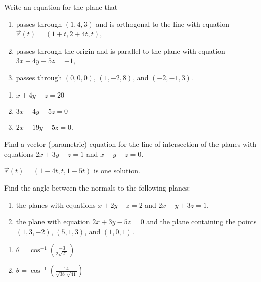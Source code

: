 \begin{exercises}
\begin{problist}
        \prob   Write an equation for the plane that
        \begin{enumerate}
            \item   passes through $(1, 4, 3)$ and is orthogonal to the line with equation $\vec{r}(t) =
                (1 + t, 2 + 4t, t)$,
            \item   passes through the origin and is parallel to the plane with equation $3x + 4y - 5z =
                -1$,
            \item   passes through $(0, 0, 0)$, $(1, -2, 8)$, and $(-2, -1, 3)$.
        \end{enumerate}
        \begin{solution}
            \begin{enumerate}
                \item   $x + 4y + z = 20$
                \item   $3x + 4y -5z = 0$
                \item   $2x - 19y -5z = 0$.           
            \end{enumerate}
        \end{solution}

        \prob   Find a vector (parametric) equation for the line of intersection of the planes with
        equations $2x + 3y - z = 1$ and $x - y - z = 0$.
        \begin{solution}
            $\vec{r}(t) = (1-4t, t, 1-5t)$ is one solution.
        \end{solution}

        \prob   Find the angle between the normals to the following planes:
        \begin{enumerate}
            \item   the planes with equations $x + 2y -z = 2$ and $2x - y + 3z = 1$,
            \item   the plane with equation $2x+3y-5z=0$ and the plane containing the points $(1,3,-2)$,
                $(5,1,3)$, and $(1,0,1)$.
        \end{enumerate}
        \begin{solution}
            \begin{enumerate}
                \item   $\theta = \cos^{-1}\left(\frac{-3}{2\sqrt{21}}\right)$
                \item   $\theta = \cos^{-1}\left(\frac{14}{\sqrt{38}\,\sqrt{41}}\right)$
            \end{enumerate}
        \end{solution}


\end{problist}
\end{exercises}
